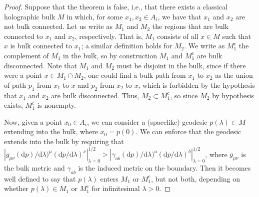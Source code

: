 \documentclass[12pt,english]{article}
\begin{document}
\begin{proof}
Suppose that the theorem is false, i.e., that there exists a classical holographic bulk $M$ in which, for some $x_1, x_2\in A_i$, we have that $x_1$ and $x_2$ are not bulk connected. Let us write as $M_1$ and $M_2$ the regions that are bulk connected to $x_1$ and $x_2$, respectively. That is, $M_1$ consists of all $x\in M$ such that $x$ is bulk connected to $x_1$; a similar definition holds for $M_2$. We write as $M_1^\mathrm{c}$ the complement of $M_1$ in the bulk, so by construction $M_1$ and $M_1^\mathrm{c}$ are bulk disconnected. Note that $M_1$ and $M_2$ must be disjoint in the bulk, since if there were a point $x\in M_1\cap M_2$, one could find a bulk path from $x_1$ to $x_2$ as the union of path $p_1$ from $x_1$ to $x$ and $p_2$ from $x_2$ to $x$, which is forbidden by the hypothesis that $x_1$ and $x_2$ are bulk disconnected. Thus, $M_2 \subset M_1^\mathrm{c}$, so since $M_2$ by hypothesis exists, $M_1^\mathrm{c}$ is nonempty.

Now, given a point $x_0\in A_i$, we can consider a (spacelike) geodesic $p(\lambda)\subset M$ extending into the bulk, where $x_0=p(0)$. We can enforce that the geodesic extends into the bulk by requiring that $|g_{\mu\nu}(\mathrm{d}p)/\mathrm{d}\lambda)^\mu (\mathrm{d}p/\mathrm{d}\lambda)^\nu|_{\lambda = 0}^{1/2} > |\gamma_{ab}(\mathrm{d}p)/\mathrm{d}\lambda)^a (\mathrm{d}p/\mathrm{d}\lambda)^b|_{\lambda = 0}^{1/2}$, where $g_{\mu\nu}$ is the bulk metric and $\gamma_{ab}$ is the induced metric on the boundary. Then it becomes well defined to say that $p(\lambda)$ enters $M_1$ or $M_1^\mathrm{c}$, but not both, depending on whether $p(\lambda)\in M_1$ or $M_1^\mathrm{c}$ for infinitesimal $\lambda > 0$.


\end{proof}
\end{document}

